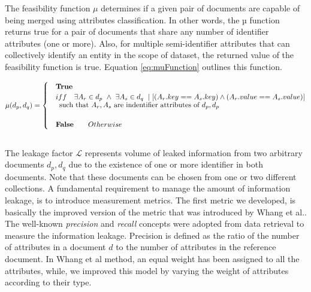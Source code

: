 The feasibility function $\mu$ determines if a given pair of documents are capable of being merged using attributes classification. In other words, the µ function returns true for a pair of documents that share any number of identifier attributes (one or more). Also, for multiple semi-identifier attributes that can collectively identify an entity in the scope of dataset, the returned value of the feasibility function is true. Equation \ref{eq:muFunction} outlines this function.


\begin{equation}
\label{eq:muFunction}
\begin{aligned}
& \mu(d_p,d_q)= \begin{cases}
&\textbf{True} \\
&iff \quad \exists A_r \in d_p ~ \land ~\exists A_s \in d_q ~ \mid [(A_r.key==A_s.key) \land (A_r.value==A_s.value)]\\
\noalign{\text{such that $A_r, A_s$ are indentifier attributes of $d_p, d_p$}}\\
&\textbf{False} \qquad Otherwise
\end{cases}\\
\end{aligned}
\end{equation}\\
The leakage factor $\mathcal{L}$ represents volume of leaked information from two arbitrary documents $d_p, d_q$ due to the existence of one or more identifier in both documents. Note that these documents can be chosen from one or two different collections. A fundamental requirement to manage the amount of information leakage,  is to introduce measurement metrics. The first metric we developed, is basically the improved version of the metric that was introduced by Whang et al.\cite{whang2010managing}. The well-known \emph{precision} and \emph{recall} concepts were adopted from data retrieval to measure the information leakage. Precision is defined as the ratio of the number of attributes in a document $d$ to the number of attributes in the reference document. In Whang et al method, an equal weight has been assigned to all the attributes, while, we improved this model by varying  the weight of attributes according to their type.


